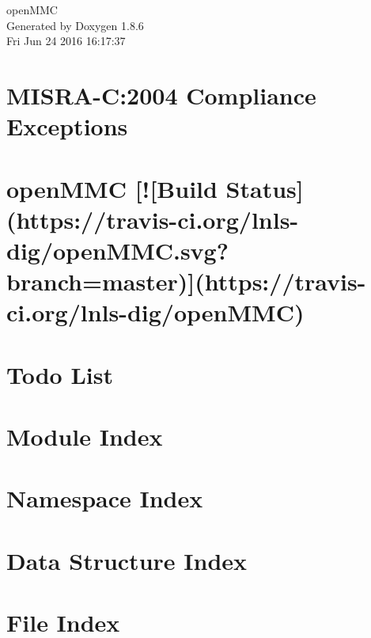 \documentclass[twoside]{book}
\newcommand{\clearemptydoublepage}{%
  \newpage{\pagestyle{empty}\cleardoublepage}%
}
\begin{document}
\hypersetup{pageanchor=false}
\begin{titlepage}
\vspace*{7cm}
\begin{center}%
{\Large open\-M\-M\-C }\\
\vspace*{1cm}
{\large Generated by Doxygen 1.8.6}\\
\vspace*{0.5cm}
{\small Fri Jun 24 2016 16:17:37}\\
\end{center}
\end{titlepage}
\clearemptydoublepage
\tableofcontents
\clearemptydoublepage
{}
\hypersetup{pageanchor=true}

\chapter{M\-I\-S\-R\-A-\/\-C\-:2004 Compliance Exceptions}
\label{CMSIS_MISRA_Exceptions}
\hypertarget{CMSIS_MISRA_Exceptions}{}

\chapter{open\-M\-M\-C \mbox{[}!\mbox{[}Build Status\mbox{]}(https\-://travis-\/ci.org/lnls-\/dig/open\-M\-M\-C.svg?branch=master)\mbox{]}(https\-://travis-\/ci.org/lnls-\/dig/open\-M\-M\-C)}
\label{md__home_henrique_rep_openMMC_README}
\hypertarget{md__home_henrique_rep_openMMC_README}{}

\chapter{Todo List}
\label{todo}
\hypertarget{todo}{}

\chapter{Module Index}

\chapter{Namespace Index}

\chapter{Data Structure Index}

\chapter{File Index}

\end{document}
